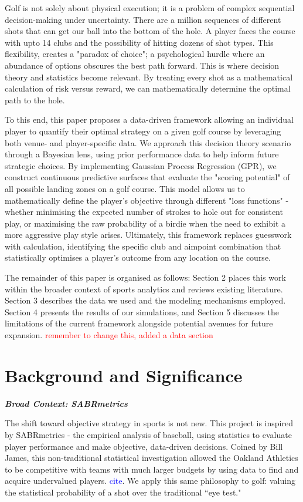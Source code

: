 \documentclass[11pt, letterpaper]{article}
\begin{document}
Golf is not solely about physical execution; it is a problem of complex sequential decision-making under uncertainty. There are a million sequences of different shots that can get our ball into the bottom of the hole. A player faces the course with upto 14 clubs and the possibility of hitting dozens of shot types. This flexibility, creates a "paradox of choice"; a psychological hurdle where an abundance of options obscures the best path forward. This is where decision theory and statistics become relevant. By treating every shot as a mathematical calculation of risk versus reward, we can mathematically determine the optimal path to the hole.

To this end, this paper proposes a data-driven framework allowing an individual player to quantify their optimal strategy on a given golf course by leveraging both venue- and player-specific data. We 
approach this decision theory scenario through a Bayesian lens, using prior performance data to help inform future strategic choices. By implementing Gaussian Process Regression (GPR), we construct continuous predictive surfaces that evaluate the "scoring potential" of all possible landing zones on a golf course. This model allows us to mathematically define the player's objective through different "loss functions" - whether minimising the expected number of strokes to hole out for consistent play, or maximising the raw probability of a birdie when the need to exhibit a more aggressive play style arises. Ultimately, this framework replaces guesswork with calculation, identifying the specific club and aimpoint combination that statistically optimises a player's outcome from any location on the course.

The remainder of this paper is organised as follows: Section 2 places this work within the broader context of sports analytics and reviews existing literature. Section 3 describes the data we used and the modeling mechanisms employed. Section 4 presents the results of our simulations, and Section 5 discusses the limitations of the current framework alongside potential avenues for future expansion. \textcolor{red}{remember to change this, added a data section}

\section{Background and Significance}

\textbf{\emph{Broad Context: SABRmetrics}}

The shift toward objective strategy in sports is not new. 
This project is inspired by SABRmetrics - the empirical analysis of baseball, using statistics to evaluate player performance and make objective, data-driven decisions. Coined by Bill James, this non-traditional statistical investigation allowed the Oakland Athletics to be competitive with teams with much larger budgets by using data to find and acquire undervalued players. \textcolor{blue}{cite}. We apply this same philosophy to golf: valuing the statistical probability of a shot over the traditional ``eye test."
\end{document}
